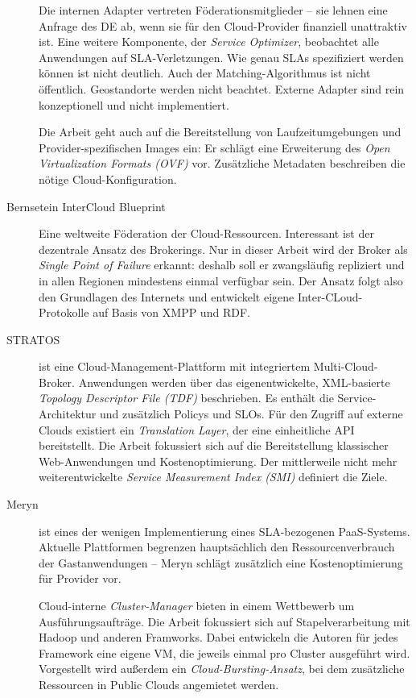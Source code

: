 \begin{description}
	Die internen Adapter vertreten Föderationsmitglieder -- sie lehnen eine Anfrage des DE ab, wenn sie für den Cloud-Provider finanziell unattraktiv ist. Eine weitere Komponente, der \emph{Service Optimizer}, beobachtet alle Anwendungen auf SLA-Verletzungen. Wie genau SLAs spezifiziert werden können ist nicht deutlich. Auch der Matching-Algorithmus ist nicht öffentlich. Geostandorte werden nicht beachtet. Externe Adapter sind rein konzeptionell und nicht implementiert.
	
	Die Arbeit geht auch auf die Bereitstellung von Laufzeitumgebungen und Provider-spezifischen Images ein: Er schlägt eine Erweiterung des \emph{Open Virtualization Formats (OVF)} vor. Zusätzliche Metadaten beschreiben die nötige Cloud-Konfiguration.
	
	
	\item[Bernsetein InterCloud Blueprint] Eine weltweite Föderation der Cloud-Ressourcen. Interessant ist der dezentrale Ansatz des Brokerings. Nur in dieser Arbeit wird der Broker als \emph{Single Point of Failure} erkannt: deshalb soll er zwangsläufig repliziert und in allen Regionen mindestens einmal verfügbar sein. Der Ansatz folgt also den Grundlagen des Internets und entwickelt eigene Inter-CLoud-Protokolle auf Basis von XMPP und RDF.
	
	
	\item[STRATOS] ist eine Cloud-Management-Plattform mit integriertem Multi-Cloud-Broker. Anwendungen werden über das eigenentwickelte, XML-basierte \emph{Topology Descriptor File (TDF)} beschrieben. Es enthält die Service-Architektur und zusätzlich Policys und SLOs. Für den Zugriff auf externe Clouds existiert ein \emph{Translation Layer}, der eine einheitliche API bereitstellt. Die Arbeit fokussiert sich auf die Bereitstellung klassischer Web-Anwendungen und Kostenoptimierung. Der mittlerweile nicht mehr weiterentwickelte \emph{Service Measurement Index (SMI)} definiert die Ziele.
	
	\item[Meryn] ist eines der wenigen Implementierung eines SLA-bezogenen PaaS-Systems. Aktuelle Plattformen begrenzen hauptsächlich den Ressourcenverbrauch der Gastanwendungen -- Meryn schlägt zusätzlich eine Kostenoptimierung für Provider vor.
	
	Cloud-interne \emph{Cluster-Manager} bieten in einem Wettbewerb um Ausführungsaufträge. Die Arbeit fokussiert sich auf Stapelverarbeitung mit Hadoop und anderen Framworks. Dabei entwickeln die Autoren für jedes Framework eine eigene VM, die jeweils einmal pro Cluster ausgeführt wird. Vorgestellt wird außerdem ein \emph{Cloud-Bursting-Ansatz}, bei dem zusätzliche Ressourcen in Public Clouds angemietet werden.
	

\end{description}

